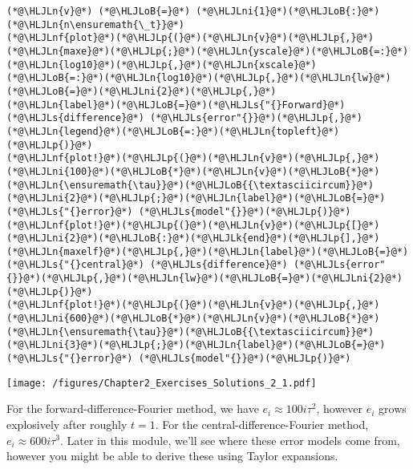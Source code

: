 \documentclass[12pt,a4paper]{article}
\newcommand{\HLJLk}[1]{\textcolor[RGB]{148,91,176}{\textbf{#1}}}
\newcommand{\HLJLn}[1]{#1}
\newcommand{\HLJLnf}[1]{\textcolor[RGB]{66,102,213}{#1}}
\newcommand{\HLJLs}[1]{\textcolor[RGB]{201,61,57}{#1}}
\newcommand{\HLJLni}[1]{\textcolor[RGB]{59,151,46}{#1}}
\newcommand{\HLJLoB}[1]{\textcolor[RGB]{102,102,102}{\textbf{#1}}}
\newcommand{\HLJLp}[1]{#1}
\begin{document}
\begin{lstlisting}
(*@\HLJLn{v}@*) (*@\HLJLoB{=}@*) (*@\HLJLni{1}@*)(*@\HLJLoB{:}@*)(*@\HLJLn{n\ensuremath{\_t}}@*)
(*@\HLJLnf{plot}@*)(*@\HLJLp{(}@*)(*@\HLJLn{v}@*)(*@\HLJLp{,}@*)(*@\HLJLn{maxe}@*)(*@\HLJLp{;}@*)(*@\HLJLn{yscale}@*)(*@\HLJLoB{=:}@*)(*@\HLJLn{log10}@*)(*@\HLJLp{,}@*)(*@\HLJLn{xscale}@*)(*@\HLJLoB{=:}@*)(*@\HLJLn{log10}@*)(*@\HLJLp{,}@*)(*@\HLJLn{lw}@*)(*@\HLJLoB{=}@*)(*@\HLJLni{2}@*)(*@\HLJLp{,}@*)
(*@\HLJLn{label}@*)(*@\HLJLoB{=}@*)(*@\HLJLs{"{}Forward}@*) (*@\HLJLs{difference}@*) (*@\HLJLs{error"{}}@*)(*@\HLJLp{,}@*)(*@\HLJLn{legend}@*)(*@\HLJLoB{=:}@*)(*@\HLJLn{topleft}@*)(*@\HLJLp{)}@*)
(*@\HLJLnf{plot!}@*)(*@\HLJLp{(}@*)(*@\HLJLn{v}@*)(*@\HLJLp{,}@*)(*@\HLJLni{100}@*)(*@\HLJLoB{*}@*)(*@\HLJLn{v}@*)(*@\HLJLoB{*}@*)(*@\HLJLn{\ensuremath{\tau}}@*)(*@\HLJLoB{{\textasciicircum}}@*)(*@\HLJLni{2}@*)(*@\HLJLp{;}@*)(*@\HLJLn{label}@*)(*@\HLJLoB{=}@*)(*@\HLJLs{"{}error}@*) (*@\HLJLs{model"{}}@*)(*@\HLJLp{)}@*)
(*@\HLJLnf{plot!}@*)(*@\HLJLp{(}@*)(*@\HLJLn{v}@*)(*@\HLJLp{[}@*)(*@\HLJLni{2}@*)(*@\HLJLoB{:}@*)(*@\HLJLk{end}@*)(*@\HLJLp{],}@*)(*@\HLJLn{maxelf}@*)(*@\HLJLp{,}@*)(*@\HLJLn{label}@*)(*@\HLJLoB{=}@*)(*@\HLJLs{"{}central}@*) (*@\HLJLs{difference}@*) (*@\HLJLs{error"{}}@*)(*@\HLJLp{,}@*)(*@\HLJLn{lw}@*)(*@\HLJLoB{=}@*)(*@\HLJLni{2}@*)(*@\HLJLp{)}@*)
(*@\HLJLnf{plot!}@*)(*@\HLJLp{(}@*)(*@\HLJLn{v}@*)(*@\HLJLp{,}@*)(*@\HLJLni{600}@*)(*@\HLJLoB{*}@*)(*@\HLJLn{v}@*)(*@\HLJLoB{*}@*)(*@\HLJLn{\ensuremath{\tau}}@*)(*@\HLJLoB{{\textasciicircum}}@*)(*@\HLJLni{3}@*)(*@\HLJLp{;}@*)(*@\HLJLn{label}@*)(*@\HLJLoB{=}@*)(*@\HLJLs{"{}error}@*) (*@\HLJLs{model"{}}@*)(*@\HLJLp{)}@*)
\end{lstlisting}

\texttt{[image: /figures/Chapter2\_Exercises\_Solutions\_2\_1.pdf]}

For the forward-difference-Fourier method, we have $e_i \approx 100 i \tau^2$, however $e_i$ grows explosively after roughly $t = 1$.  For the central-difference-Fourier method, $e_i \approx 600 i \tau^3$.  Later in this module, we'll see where these error models come from, however you might be able to derive these using Taylor expansions.
\end{document}
